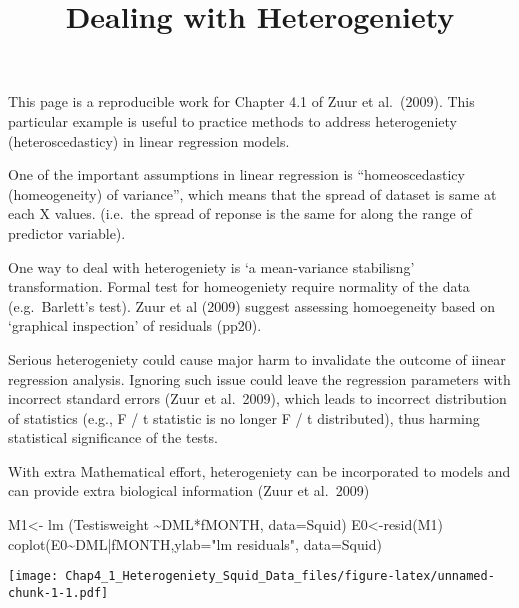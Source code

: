 \documentclass[
]{article}
\title{Dealing with Heterogeniety}
\author{}
\date{\vspace{-2.5em}}
\newenvironment{Shaded}{\begin{snugshade}}{\end{snugshade}}
\newcommand{\AttributeTok}[1]{\textcolor[rgb]{0.77,0.63,0.00}{#1}}
\newcommand{\FunctionTok}[1]{\textcolor[rgb]{0.00,0.00,0.00}{#1}}
\newcommand{\NormalTok}[1]{#1}
\newcommand{\OtherTok}[1]{\textcolor[rgb]{0.56,0.35,0.01}{#1}}
\newcommand{\SpecialCharTok}[1]{\textcolor[rgb]{0.00,0.00,0.00}{#1}}
\newcommand{\StringTok}[1]{\textcolor[rgb]{0.31,0.60,0.02}{#1}}
\begin{document}
\maketitle

This page is a reproducible work for Chapter 4.1 of Zuur et al.~(2009).
This particular example is useful to practice methods to address
heterogeniety (heteroscedasticy) in linear regression models.

One of the important assumptions in linear regression is
``homeoscedasticy (homeogeneity) of variance'', which means that the
spread of dataset is same at each X values. (i.e.~the spread of reponse
is the same for along the range of predictor variable).

One way to deal with heterogeniety is `a mean-variance stabilisng'
transformation. Formal test for homeogeniety require normality of the
data (e.g.~Barlett's test). Zuur et al (2009) suggest assessing
homoegeneity based on `graphical inspection' of residuals (pp20).

Serious heterogeniety could cause major harm to invalidate the outcome
of iinear regression analysis. Ignoring such issue could leave the
regression parameters with incorrect standard errors (Zuur et al.~2009),
which leads to incorrect distribution of statistics (e.g., F / t
statistic is no longer F / t distributed), thus harming statistical
significance of the tests.

With extra Mathematical effort, heterogeniety can be incorporated to
models and can provide extra biological information (Zuur et al.~2009)

\begin{Shaded}
\begin{Highlighting}[]
\NormalTok{M1}\OtherTok{\textless{}{-}} \FunctionTok{lm}\NormalTok{ (Testisweight }\SpecialCharTok{\textasciitilde{}}\NormalTok{DML}\SpecialCharTok{*}\NormalTok{fMONTH, }\AttributeTok{data=}\NormalTok{Squid)}
\NormalTok{E0}\OtherTok{\textless{}{-}}\FunctionTok{resid}\NormalTok{(M1)}
\FunctionTok{coplot}\NormalTok{(E0}\SpecialCharTok{\textasciitilde{}}\NormalTok{DML}\SpecialCharTok{|}\NormalTok{fMONTH,}\AttributeTok{ylab=}\StringTok{"lm residuals"}\NormalTok{, }\AttributeTok{data=}\NormalTok{Squid)}
\end{Highlighting}
\end{Shaded}

\texttt{[image: Chap4\_1\_Heterogeniety\_Squid\_Data\_files/figure-latex/unnamed-chunk-1-1.pdf]}
\end{document}
